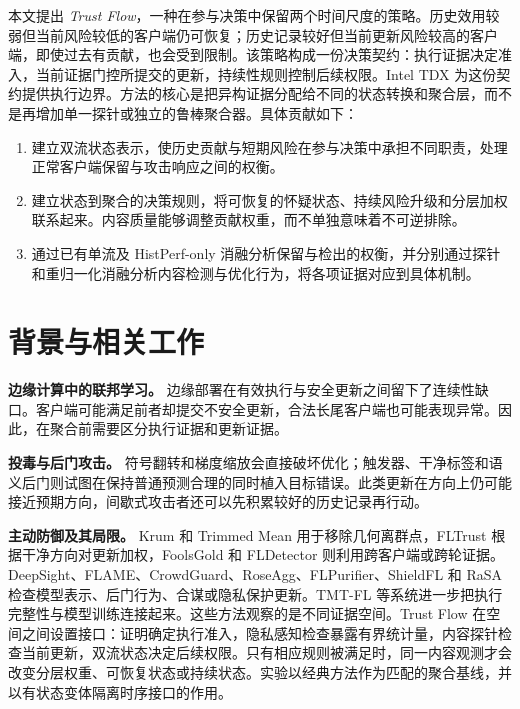 \documentclass[10pt,a4paper,UTF8,fontset=fandol]{ctexart}
\newenvironment{tightenumerate}{%
  \begin{enumerate}\setlength{\itemsep}{1pt}\setlength{\parskip}{0pt}\setlength{\parsep}{0pt}}{\end{enumerate}}
\begin{document}
本文提出 \emph{Trust Flow}，一种在参与决策中保留两个时间尺度的策略。历史效用较弱但当前风险较低的客户端仍可恢复；历史记录较好但当前更新风险较高的客户端，即使过去有贡献，也会受到限制。该策略构成一份决策契约：执行证据决定准入，当前证据门控所提交的更新，持续性规则控制后续权限。Intel TDX 为这份契约提供执行边界。方法的核心是把异构证据分配给不同的状态转换和聚合层，而不是再增加单一探针或独立的鲁棒聚合器。具体贡献如下：
\begin{tightenumerate}
    \item 建立双流状态表示，使历史贡献与短期风险在参与决策中承担不同职责，处理正常客户端保留与攻击响应之间的权衡。
    \item 建立状态到聚合的决策规则，将可恢复的怀疑状态、持续风险升级和分层加权联系起来。内容质量能够调整贡献权重，而不单独意味着不可逆排除。
    \item 通过已有单流及 HistPerf-only 消融分析保留与检出的权衡，并分别通过探针和重归一化消融分析内容检测与优化行为，将各项证据对应到具体机制。
\end{tightenumerate}

\section{背景与相关工作}

\textbf{边缘计算中的联邦学习。} 边缘部署在有效执行与安全更新之间留下了连续性缺口。客户端可能满足前者却提交不安全更新，合法长尾客户端也可能表现异常。因此，在聚合前需要区分执行证据和更新证据。

\textbf{投毒与后门攻击。} 符号翻转和梯度缩放会直接破坏优化；触发器、干净标签和语义后门则试图在保持普通预测合理的同时植入目标错误。此类更新在方向上仍可能接近预期方向\cite{bagdasaryan2020backdoor,wang2019neuralcleanse}，间歇式攻击者还可以先积累较好的历史记录再行动。

\textbf{主动防御及其局限。} Krum 和 Trimmed Mean 用于移除几何离群点\cite{blanchard2017krum,yin2018byzantine}，FLTrust 根据干净方向对更新加权\cite{cao2021fltrust}，FoolsGold 和 FLDetector 则利用跨客户端或跨轮证据\cite{fung2020foolsgold,fldetector2022}。DeepSight、FLAME、CrowdGuard、RoseAgg、FLPurifier、ShieldFL 和 RaSA 检查模型表示、后门行为、合谋或隐私保护更新\cite{deepsight2022,flame2022,crowdguard2024,roseagg,flpurifier,shieldfl,wang2025rasa}。TMT-FL 等系统进一步把执行完整性与模型训练连接起来\cite{lu2025tmt}。这些方法观察的是不同证据空间。Trust Flow 在空间之间设置接口：证明确定执行准入，隐私感知检查暴露有界统计量，内容探针检查当前更新，双流状态决定后续权限。只有相应规则被满足时，同一内容观测才会改变分层权重、可恢复状态或持续状态。实验以经典方法作为匹配的聚合基线，并以有状态变体隔离时序接口的作用。
\end{document}

